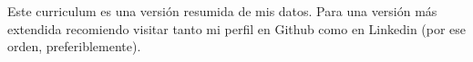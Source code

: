 Este curriculum es una versión resumida de mis datos. Para una versión más extendida recomiendo visitar tanto mi perfil en Github como en Linkedin (por ese orden, preferiblemente).
